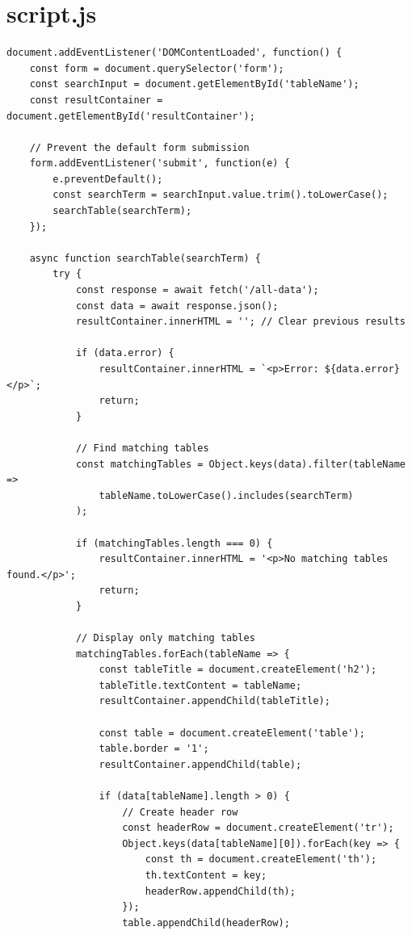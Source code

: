 \documentclass{report}
\begin{document}
\section{script.js}
\begin{verbatim}
document.addEventListener('DOMContentLoaded', function() {
    const form = document.querySelector('form');
    const searchInput = document.getElementById('tableName');
    const resultContainer = document.getElementById('resultContainer');
 
    // Prevent the default form submission
    form.addEventListener('submit', function(e) {
        e.preventDefault();
        const searchTerm = searchInput.value.trim().toLowerCase();
        searchTable(searchTerm);
    });
 
    async function searchTable(searchTerm) {
        try {
            const response = await fetch('/all-data');
            const data = await response.json();
            resultContainer.innerHTML = ''; // Clear previous results
 
            if (data.error) {
                resultContainer.innerHTML = `<p>Error: ${data.error}</p>`;
                return;
            }
 
            // Find matching tables
            const matchingTables = Object.keys(data).filter(tableName => 
                tableName.toLowerCase().includes(searchTerm)
            );
 
            if (matchingTables.length === 0) {
                resultContainer.innerHTML = '<p>No matching tables found.</p>';
                return;
            }
 
            // Display only matching tables
            matchingTables.forEach(tableName => {
                const tableTitle = document.createElement('h2');
                tableTitle.textContent = tableName;
                resultContainer.appendChild(tableTitle);
 
                const table = document.createElement('table');
                table.border = '1';
                resultContainer.appendChild(table);
 
                if (data[tableName].length > 0) {
                    // Create header row
                    const headerRow = document.createElement('tr');
                    Object.keys(data[tableName][0]).forEach(key => {
                        const th = document.createElement('th');
                        th.textContent = key;
                        headerRow.appendChild(th);
                    });
                    table.appendChild(headerRow);
 

\end{verbatim}
\end{document}
